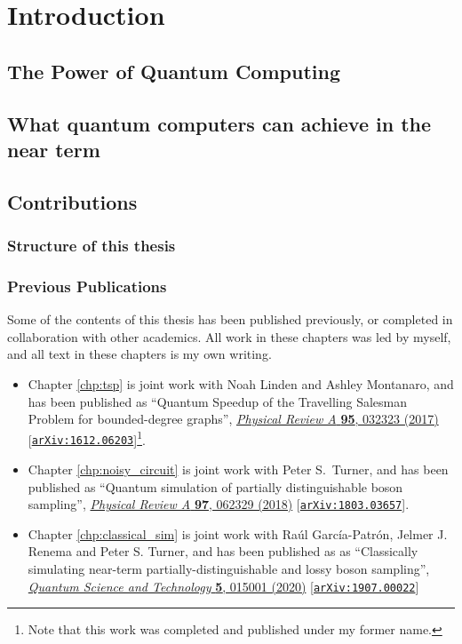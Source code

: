 \chapter{Introduction}

\section{The Power of Quantum Computing}

\section{What quantum computers can achieve in the near term}

\section{Contributions}

\subsection{Structure of this thesis}

\subsection{Previous Publications}

Some of the contents of this thesis has been published previously, or completed in collaboration with other academics. All work in these chapters was led by myself, and all text in these chapters is my own writing.

\begin{itemize}
\item Chapter \ref{chp:tsp} is joint work with Noah Linden and Ashley Montanaro, and has been published as ``Quantum Speedup of the Travelling Salesman Problem for bounded-degree graphs'', \href{https://link.aps.org/doi/10.1103/PhysRevA.95.032323}{\textit{Physical Review A} \textbf{95}, 032323 (2017)} [{\tt \href{https://arxiv.org/abs/1612.06203}{arXiv:1612.06203}}]\footnote{Note that this work was completed and published under my former name.}.

\item Chapter \ref{chp:noisy_circuit} is joint work with Peter S.\ Turner, and has been published as ``Quantum simulation of partially distinguishable boson sampling'', \href{https://link.aps.org/doi/10.1103/PhysRevA.97.062329}{\textit{Physical Review A} \textbf{97}, 062329 (2018)} [{\tt \href{https://arxiv.org/abs/1803.03657}{arXiv:1803.03657}}].

\item Chapter \ref{chp:classical_sim} is joint work with Ra\'{u}l Garc\'{i}a-Patr\'{o}n, Jelmer J. Renema and Peter S. Turner, and has been published as as ``Classically simulating near-term partially-distinguishable and lossy boson sampling'', \href{https://iopscience.iop.org/article/10.1088/2058-9565/ab5555}{\textit{Quantum Science and Technology} \textbf{5}, 015001 (2020)} [{\tt \href{https://arxiv.org/abs/1907.00022}{arXiv:1907.00022}}]
\end{itemize}